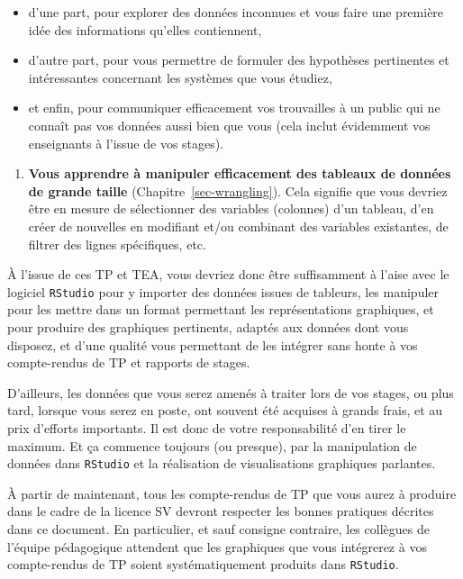 \documentclass[
  a4paper,
  DIV=11,
  numbers=noendperiod,
  oneside]{scrreprt}
\providecommand{\tightlist}{%
  \setlength{\itemsep}{0pt}\setlength{\parskip}{0pt}}\usepackage{longtable,booktabs,array}
\begin{document}
\begin{itemize}
\tightlist
\item
  d'une part, pour explorer des données inconnues et vous faire une
  première idée des informations qu'elles contiennent,
\item
  d'autre part, pour vous permettre de formuler des hypothèses
  pertinentes et intéressantes concernant les systèmes que vous étudiez,
\item
  et enfin, pour communiquer efficacement vos trouvailles à un public
  qui ne connaît pas vos données aussi bien que vous (cela inclut
  évidemment vos enseignants à l'issue de vos stages).
\end{itemize}

\begin{enumerate}
\def\labelenumi{\arabic{enumi}.}
\setcounter{enumi}{2}
\tightlist
\item
  \textbf{Vous apprendre à manipuler efficacement des tableaux de
  données de grande taille} (Chapitre~\ref{sec-wrangling}). Cela
  signifie que vous devriez être en mesure de sélectionner des variables
  (colonnes) d'un tableau, d'en créer de nouvelles en modifiant et/ou
  combinant des variables existantes, de filtrer des lignes spécifiques,
  etc.
\end{enumerate}

À l'issue de ces TP et TEA, vous devriez donc être suffisamment à l'aise
avec le logiciel \texttt{RStudio} pour y importer des données issues de
tableurs, les manipuler pour les mettre dans un format permettant les
représentations graphiques, et pour produire des graphiques pertinents,
adaptés aux données dont vous disposez, et d'une qualité vous permettant
de les intégrer sans honte à vos compte-rendus de TP et rapports de
stages.

D'ailleurs, les données que vous serez amenés à traiter lors de vos
stages, ou plus tard, lorsque vous serez en poste, ont souvent été
acquises à grands frais, et au prix d'efforts importants. Il est donc de
votre responsabilité d'en tirer le maximum. Et ça commence toujours (ou
presque), par la manipulation de données dans \texttt{RStudio} et la
réalisation de visualisations graphiques parlantes.

\begin{tcolorbox}[enhanced jigsaw, colbacktitle=quarto-callout-important-color!10!white, left=2mm, leftrule=.75mm, titlerule=0mm, bottomtitle=1mm, colback=white, breakable, arc=.35mm, bottomrule=.15mm, toprule=.15mm, toptitle=1mm, opacitybacktitle=0.6, title=\textcolor{quarto-callout-important-color}{\faExclamation}\hspace{0.5em}{Important}, coltitle=black, rightrule=.15mm, opacityback=0, colframe=quarto-callout-important-color-frame]

À partir de maintenant, tous les compte-rendus de TP que vous aurez à
produire dans le cadre de la licence SV devront respecter les bonnes
pratiques décrites dans ce document. En particulier, et sauf consigne
contraire, les collègues de l'équipe pédagogique attendent que les
graphiques que vous intégrerez à vos compte-rendus de TP soient
systématiquement produits dans \texttt{RStudio}.

\end{tcolorbox}
\end{document}

